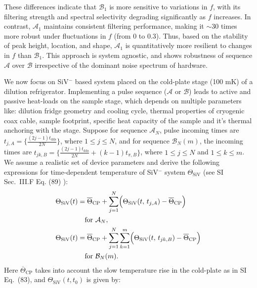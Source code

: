 \documentclass[%
 reprint,
 superscriptaddress,
 amsmath,amssymb,
 aps,
 prx,
]{revtex4-2}
\begin{document}
These differences indicate that \( \mathcal{B}_1 \) is more sensitive to variations in \( f \), with its filtering strength and spectral selectivity degrading significantly as \( f \) increases. In contrast, \( \mathcal{A}_1 \) maintains consistent filtering performance, making it $\sim30$ times more robust under fluctuations in $f$ (from 0 to 0.3). Thus, based on the stability of peak height, location, and shape, \( \mathcal{A}_1 \) is quantitatively more resilient to changes in \( f \) than \( \mathcal{B}_1 \). This approach is system agnostic, and shows robustness of sequence $\mathcal{A}$ over $\mathcal{B}$ irrespective of the dominant noise spectrum of hardware.

We now focus on SiV$^{-}$ based system placed on the cold-plate stage (100 mK) of a dilution refrigerator. Implementing a pulse sequence ($\mathcal{A}$ or $\mathcal{B}$) leads to active and passive heat-loads on the sample stage, which depends on multiple parameters like: dilution fridge geometry and cooling cycle, thermal properties of cryogenic coax cable, sample footprint, specific heat capacity of the sample and it's thermal anchoring with the stage. Suppose for sequence $\mathcal{A}_{N}$, pulse incoming times are $t_{j,A}=\{ \frac{(2j-1)t_{\text{dds}}}{2N} \}$, where $1\le j \le N$, and for sequence $\mathcal{B}_{N}(m)$, the incoming times are $t_{jk,B}=\{ \frac{(2j-1)t_{\text{dds}}}{2N} + (k-1)t_{\pi,B}\}$, where $1\le j \le N$ and $1\le k \le m$. We assume a realistic set of device parameters and derive the following expressions for time-dependent temperature of SiV$^{-}$ system $\Theta_{\text{SiV}}$ (see SI Sec.~III.F Eq. (89) \cite{googleSI_Programmable_Quantum_Matter_2025Google}):
\begin{subequations}
\begin{align}
\Theta_{\mathrm{SiV}}(t)
&= \overline{\Theta}_{\mathrm{CP}}
  + \sum_{j=1}^{N}\Bigl(
      \Theta_{\mathrm{SiV}}(t,\,t_{j,A})
      - \overline{\Theta}_{\mathrm{CP}}
    \Bigr)
  \\
&\quad \text{for }\mathcal{A}_{N}, \nonumber\\
\Theta_{\mathrm{SiV}}(t)
&= \overline{\Theta}_{\mathrm{CP}}
  + \sum_{j=1}^{N}\sum_{k=1}^{m}\Bigl(
      \Theta_{\mathrm{SiV}}(t,\,t_{jk,B})
      - \overline{\Theta}_{\mathrm{CP}}
    \Bigr)
  \\
&\quad \text{for }\mathcal{B}_{N}(m). \nonumber
\end{align}
\end{subequations}
Here $\overline{\Theta}_{\text{CP}}$ takes into account the slow temperature rise in the cold-plate as in SI Eq.~(83), and $\Theta_{\text{SiV}}(t, t_{0})$ is given by:
\end{document}
